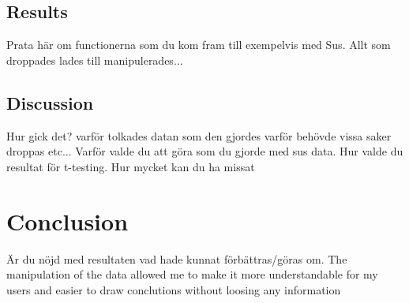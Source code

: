  
\subsection{Results}

Prata här om functionerna som du kom fram till exempelvis med Sus. Allt som droppades lades till manipulerades...


\subsection{Discussion}
Hur gick det? varför tolkades datan som den gjordes varför behövde vissa saker droppas etc... Varför valde du att göra som du gjorde med sus data. Hur valde du resultat för t-testing. Hur mycket kan du ha missat




\section{Conclusion}
Är du nöjd med resultaten vad hade kunnat förbättras/göras om.
The manipulation of the data allowed me to make it more understandable for my users and easier to draw conclutions without loosing any information